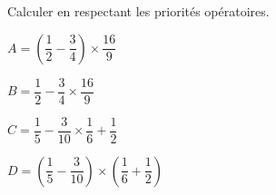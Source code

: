 \begin{exercice*}
    Calculer en respectant les priorités opératoires.
        \begin{multicols}{2}
            \begin{spacing}{1.5}
                \begin{list}{}{}
                    \item $A=\left(\dfrac{1}{2}-\dfrac{3}{4}\right)\times\dfrac{16}{9}$
                    \item $B=\dfrac{1}{2}-\dfrac{3}{4}\times\dfrac{16}{9}$
                    \item $C=\dfrac{1}{5}-\dfrac{3}{10}\times\dfrac{1}{6}+\dfrac{1}{2}$
                    \item $D=\left(\dfrac{1}{5}-\dfrac{3}{10}\right)\times\left(\dfrac{1}{6}+\dfrac{1}{2}\right)$
                \end{list}
            \end{spacing}
        \end{multicols}
\end{exercice*}
